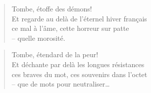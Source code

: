 \newpage
{}
  \begin{verse}
    Tombe, étoffe des démons!\\
    Et regarde au delà de l’éternel hiver français\\
    ce mal à l’âme, cette horreur sur patte\\
    -- quelle morosité.
  \end{verse}
  \begin{verse}
    Tombe, étendard de la peur!\\
    Et déchante par delà les longues résistances\\
    ces braves du mot, ces souvenirs dans l’octet\\
    -- que de mots pour neutraliser…
  \end{verse}
